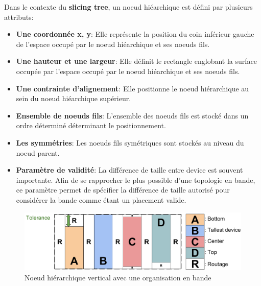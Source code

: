 \indent Dans le contexte du \textbf{slicing tree}, un noeud hiéarchique est défini par plusieurs attributs:

\begin{itemize}
\item \textbf{Une coordonnée x, y}: Elle représente la position du coin inférieur gauche de l'espace occupé par le noeud hiéarchique et ses noeuds fils.
\item \textbf{Une hauteur et une largeur}: Elle définit le rectangle englobant la surface occupée par l'espace occupé par le noeud hiéarchique et ses noeuds fils.
\item \textbf{Une contrainte d'alignement}: Elle positionne le noeud hiérarchique au sein du noeud hiéarchique supérieur.
\item \textbf{Ensemble de noeuds fils}: L'ensemble des noeuds fils est stocké dans un ordre déterminé déterminant le positionnement.
\item \textbf{Les symmétries}: Les noeuds fils symétriques sont stockés au niveau du noeud parent.
\item \textbf{Paramètre de validité}: La différence de taille entre device est souvent importante. Afin de se rapprocher le plus possible d'une topologie en bande, ce paramètre permet de spécifier la différence de taille autorisé pour considérer la bande comme étant un placement valide.
\end{itemize}
\begin{figure}[h]
\begin{center}
\includegraphics[height=0.15\textheight]{Figures/14.pdf}
\caption{Noeud hiérarchique vertical avec une organisation en bande}
\label{fig:14}
\end{center}
\end{figure} 

